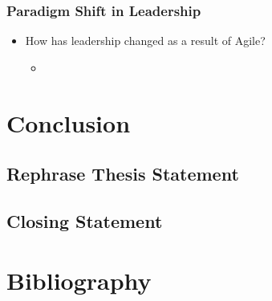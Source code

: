 \documentclass[12pt,a4paper]{article}
\begin{document}
		\subsubsection{Paradigm Shift in Leadership}
		\begin{itemize}[noitemsep]
			\item How has leadership changed as a result of Agile?
			\begin{itemize}
				\item \cite{bosch_2014}
			\end{itemize}
		\end{itemize}

\section{Conclusion}
	\subsection{Rephrase Thesis Statement}
	\subsection{Closing Statement}

\newpage
\section{Bibliography}
\nocite{*}


\end{document}
